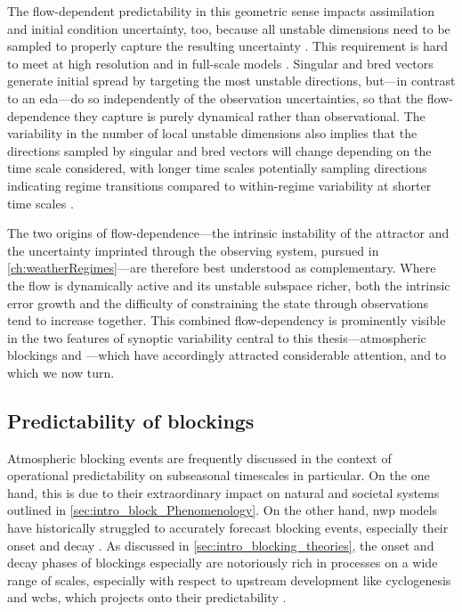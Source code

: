 The flow-dependent predictability in this geometric sense impacts assimilation
and initial condition uncertainty, too, because all unstable dimensions
need to be sampled to properly capture the resulting uncertainty
\parencite{quinnApplicationLocalAttractor2020,fengEnsembleForecastingForay2024}.
This requirement is hard to meet at high
resolution and in full-scale models \parencite{craigDistributionsConvergenceForecast2022,
    tempestConvergenceForecastDistributions2023}.
Singular and bred vectors generate initial spread
by targeting the most unstable directions, but---in contrast to an
\gls{eda}---do so independently of the observation uncertainties, so that the
flow-dependence they capture is purely dynamical rather than observational.
The variability in the number of local unstable dimensions also implies that
the directions sampled by singular and bred vectors will change depending on
the time scale considered, with longer time scales
potentially sampling directions indicating regime transitions compared to
within-regime variability at shorter time scales
\parencite{derembleFixedPointsStable2009}.

The two origins of flow-dependence---the intrinsic instability of the
attractor and the uncertainty imprinted through the observing system,
pursued in \cref{ch:weatherRegimes}---are therefore best understood as
complementary. Where the flow is dynamically active and its unstable subspace
richer, both the intrinsic error growth and the difficulty of constraining
the state through observations tend to increase together.
This combined flow-dependency is prominently visible in the two features of
synoptic
variability central to this thesis---atmospheric blockings and
---which have accordingly attracted considerable
attention, and to which we now turn.

\subsection{Predictability of blockings}
\label{sec:intro_predictability_blockings}

Atmospheric blocking events are frequently discussed in the context of
operational predictability on subseasonal timescales in particular.
On the one hand, this is due to their extraordinary impact on natural and
societal systems outlined in \cref{sec:intro_block_Phenomenology}. On the other
hand, \gls{nwp} models have historically struggled to accurately forecast
blocking events, especially their onset and decay
\parencite{dandreaNorthernHemisphereAtmospheric1998,
    mauritsenBlockingPredictionEnsemble2004,
    quandtForecastVariabilityBlocking2017,
    matsuedaBlockingPredictabilityOperational2009,
    tibaldiOperationalPredictabilityBlocking1990}.
As discussed in \cref{sec:intro_blocking_theories},
the onset and decay phases of blockings especially are notoriously rich in
processes on a
wide range of scales, especially with respect to upstream development like
cyclogenesis and \glspl{wcb}, which projects onto their
predictability \parencite{maddisonUpstreamCycloneInfluence2019}.

